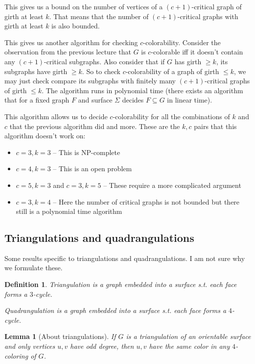 \documentclass{article}
\newtheorem*{definition}{Definition}
\newtheorem*{lemma}{Lemma}
\begin{document}
This gives us a bound on the number of vertices of a $(c + 1)$-critical graph
of girth at least $k$. That means that the number of $(c + 1)$-critical graphs
with girth at least $k$ is also bounded.

This gives us another algorithm for checking $c$-colorability. Consider the
observation from the previous lecture that $G$ is $c$-colorable iff it doesn't
contain any $(c + 1)$-critical subgraphs. Also consider that if $G$ has girth
$\ge k$, its subgraphs have girth $\ge k$. So to check $c$-colorability of a
graph of girth $\le k$, we may just check compare its subgraphs with finitely
many $(c + 1)$-critical graphs of girth $\le k$. The algorithm runs in
polynomial time (there exists an algorithm that for a fixed graph $F$ and
surface $\Sigma$ decides $F \subseteq G$ in linear time).

This algorithm allows us to decide $c$-colorability for all the combinations of
$k$ and $c$ that the previous algorithm did and more. These are the $k,c$ pairs
that this algorithm doesn't work on:
\begin{itemize}
	\item $c = 3, k = 3$ -- This is NP-complete
	\item $c = 4, k = 3$ -- This is an open problem
	\item $c = 5, k = 3$ and $c = 3, k = 5$ -- These require a more
		complicated argument
	\item $c = 3, k = 4$ -- Here the number of critical graphs is not
		bounded but there still is a polynomial time algorithm
\end{itemize}

\subsection*{Triangulations and quadrangulations}
Some results specific to triangulations and quadrangulations. I am not sure why
we formulate these.

\begin{definition}
	\emph{Triangulation} is a graph embedded into a surface s.t. each face
	forms a $3$-cycle.

	\emph{Quadrangulation} is a graph embedded into a surface s.t. each
	face forms a $4$-cycle.
\end{definition}

\begin{lemma}[About triangulations]
	If $G$ is a triangulation of an orientable surface and only vertices
	$u,v$ have odd degree, then $u,v$ have the same color in any
	$4$-coloring of $G$.
\end{lemma}
\end{document}
